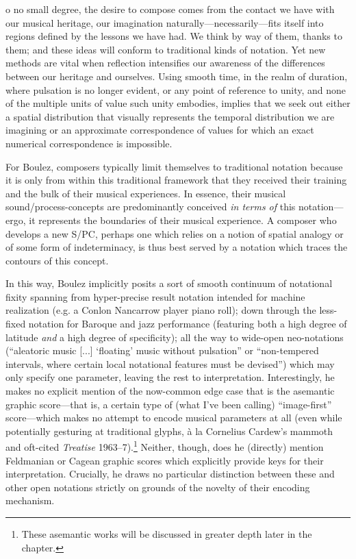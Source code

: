         \begin{smallquote}
            [T]o no small degree, the desire to compose comes from the contact we have with our musical heritage, our imagination naturally---necessarily---fits itself into regions defined by the lessons we have had. We think by way of them, thanks to them; and these ideas will conform to traditional kinds of notation. Yet new methods are vital when reflection intensifies our awareness of the differences between our heritage and ourselves. Using smooth time, in the realm of duration, where pulsation is no longer evident, or any point of reference to unity, and none of the multiple units of value such unity embodies, implies that we seek out either a spatial distribution that visually represents the temporal distribution we are imagining or an approximate correspondence of values for which an exact numerical correspondence is impossible.\autocite[531]{Boulez_Nattiez_2019}
        \end{smallquote}

    \noindent For Boulez, composers typically limit themselves to traditional notation because it is only from within this traditional framework that they received their training and the bulk of their musical experiences. In essence, their musical sound/process-concepts are predominantly conceived \textit{in terms of} this notation---ergo, it represents the boundaries of their musical experience. A composer who develops a new S/PC, perhaps one which relies on a notion of spatial analogy or of some form of indeterminacy, is thus best served by a notation which traces the contours of this concept.
    
    In this way, Boulez implicitly posits a sort of smooth continuum of notational fixity spanning from hyper-precise result notation intended for machine realization (e.g. a Conlon Nancarrow player piano roll); down through the less-fixed notation for Baroque and jazz performance (featuring both a high degree of latitude \textit{and} a high degree of specificity); all the way to wide-open neo-notations (``aleatoric music [...] `floating' music without pulsation'' or ``non-tempered intervals, where certain local notational features must be devised'') which may only specify one parameter, leaving the rest to interpretation.\autocite[53f6]{Boulez_Nattiez_2019} Interestingly, he makes no explicit mention of the now-common edge case that is the asemantic graphic score---that is, a certain type of (what I've been calling) ``image-first'' score---which makes no attempt to encode musical parameters at all (even while potentially gesturing at traditional glyphs, à la Cornelius Cardew's mammoth and oft-cited \textit{Treatise} 1963--7).\footnote{These asemantic works will be discussed in greater depth later in the chapter.} Neither, though, does he (directly) mention Feldmanian or Cagean graphic scores which explicitly provide keys for their interpretation. Crucially, he draws no particular distinction between these and other open notations strictly on grounds of the novelty of their encoding mechanism. 

